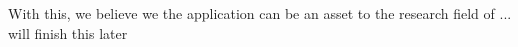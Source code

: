 With this, we believe we the application can be an asset to the research field of ... will finish this later



